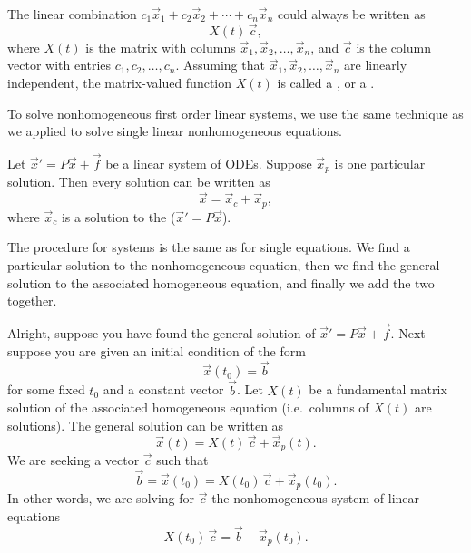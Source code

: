 The linear combination $c_1 \vec{x}_1 + c_2 \vec{x}_2 + \cdots + c_n
\vec{x}_n$ could always be written as
\begin{equation*}
X(t)\,\vec{c} ,
\end{equation*}
where $X(t)$ is the matrix with columns $\vec{x}_1, \vec{x}_2, \ldots, \vec{x}_n$,
and $\vec{c}$ is the column vector with entries $c_1, c_2, \ldots, c_n$.
Assuming that $\vec{x}_1,\vec{x}_2,\ldots,\vec{x}_n$ are linearly
independent,
the matrix-valued function $X(t)$ is called a \emph{},
or a \emph{}.

\medskip

To solve nonhomogeneous first order linear systems, we use the same
technique as we applied to solve single linear nonhomogeneous equations.

\begin{theorem}
Let
${\vec{x}}' = P\vec{x} + \vec{f}$ be a linear system of ODEs.
Suppose $\vec{x}_p$ is one particular solution.  Then every solution
can be written as
\begin{equation*}
\vec{x} = \vec{x}_c + \vec{x}_p ,
\end{equation*}
where $\vec{x}_c$ is a solution to the
(${\vec{x}}' = P\vec{x}$).
\end{theorem}

The procedure for systems is the same as for single equations.
We find a particular solution
to the nonhomogeneous equation, then we find the general solution to the
associated homogeneous equation, and finally we add the two together.

\medskip

Alright, suppose you have found the general solution of
${\vec{x}}' = P\vec{x} + \vec{f}$.  Next suppose you are given an
initial condition of the form
\begin{equation*}
\vec{x}(t_0) = \vec{b}
\end{equation*}
for some fixed $t_0$ and a constant
vector $\vec{b}$.  Let $X(t)$ be a fundamental matrix solution
of the associated homogeneous equation
(i.e.\ columns of $X(t)$ are solutions).  The general solution can be
written as
\begin{equation*}
\vec{x}(t) = X(t)\,\vec{c} + \vec{x}_p(t).
\end{equation*}
We are seeking a vector 
$\vec{c}$ such that
\begin{equation*}
\vec{b} = \vec{x}(t_0) = X(t_0)\,\vec{c} + \vec{x}_p(t_0).
\end{equation*}
In other words, we are solving for $\vec{c}$ the nonhomogeneous system of linear equations
\begin{equation*}
X(t_0)\,\vec{c} = \vec{b} - \vec{x}_p(t_0) .
\end{equation*}

